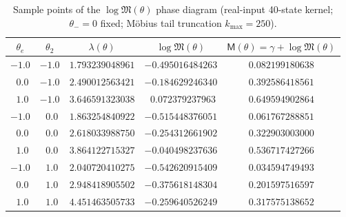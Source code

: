 \begin{table}[H]
\centering
\scriptsize
\setlength{\tabcolsep}{8pt}
\renewcommand{\arraystretch}{1.15}
\caption{Sample points of the $\log\mathfrak{M}(\theta)$ phase diagram (real-input 40-state kernel; $\theta_-=0$ fixed; M\"{o}bius tail truncation $k_{\max}=250$).}
\label{tab:real-input-40-logM-theta-sample}
\begin{tabular}{@{}ccccc@{}}
\toprule
$\theta_e$ & $\theta_2$ & $\lambda(\theta)$ & $\log\mathfrak{M}(\theta)$ & $\mathsf{M}(\theta)=\gamma+\log\mathfrak{M}(\theta)$ \\
\midrule
$-1.0$ & $-1.0$ & $1.793239048961$ & $-0.495016484263$ & $0.082199180638$ \\
$\ \ 0.0$ & $-1.0$ & $2.490012563421$ & $-0.184629246340$ & $0.392586418561$ \\
$\ \ 1.0$ & $-1.0$ & $3.646591323038$ & $\ \ 0.072379237963$ & $0.649594902864$ \\
$-1.0$ & $\ \ 0.0$ & $1.863254840922$ & $-0.515448376051$ & $0.061767288851$ \\
$\ \ 0.0$ & $\ \ 0.0$ & $2.618033988750$ & $-0.254312661902$ & $0.322903003000$ \\
$\ \ 1.0$ & $\ \ 0.0$ & $3.864122715327$ & $-0.040498237636$ & $0.536717427266$ \\
$-1.0$ & $\ \ 1.0$ & $2.040720410275$ & $-0.542620915409$ & $0.034594749493$ \\
$\ \ 0.0$ & $\ \ 1.0$ & $2.948418905502$ & $-0.375618148304$ & $0.201597516597$ \\
$\ \ 1.0$ & $\ \ 1.0$ & $4.451463505733$ & $-0.259640526249$ & $0.317575138652$ \\
\bottomrule
\end{tabular}
\end{table}

